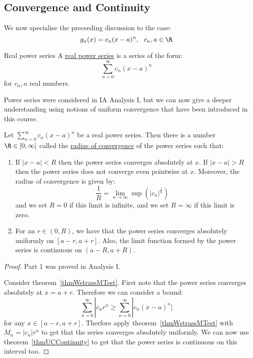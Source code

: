\documentclass[../Main.tex]{subfiles}
\begin{document}
\subsection{Convergence and Continuity}
We now specialise the preceeding discussion to the case:
\begin{equation*}
    g_n(x) = c_n (x - a)^n,~~ c_n, a \in \R
\end{equation*}
\begin{definition}{Real power series}
    A \underline{real power series} is a series of the form:
    \begin{equation*}
        \sum_{n=0}^{\infty} c_n (x-a)^n
    \end{equation*}
    for $c_n, a$ real numbers.
\end{definition}
Power series were considered in IA Analysis I, but we can now give a deeper understanding using notions of uniform convergence that have been introduced in this course.
\begin{theorem}
    Let $\sum_{n = 0}^\infty c_n (x-a)^n$ be a real power series. Then there is a number $\R \in [0, \infty]$ called the \underline{radius of convergence} of the power series such that:
    \begin{enumerate}
        \item If $|x-a| < R$ then the power series converges absolutely at $x$. If $|x-a| > R$ then the power series does not converge even pointwise at $x$.
            Moreover, the radius of convergence is given by:
            \begin{equation*}
                \frac{1}{R} = \lim_{n \to\infty} \sup(|c_n|^\frac{1}{n})
            \end{equation*}
            and we set $R = 0$ if this limit is infinite, and we set $R = \infty$ if this limit is zero.
            \item For an $r \in (0, R)$, we have that the power series converges absolutely uniformly on $[a-r,a+r]$. Also, the limit function formed by the power series is continuous on $(a-R, a+R)$.
    \end{enumerate} 
    \label{thmRadiusConvergence}
\end{theorem}
\begin{proof}
    Part 1 was proved in Analysis I.

    Consider theorem~\ref{thmWstrassMTest}. First note that the power series converges absolutely at $x = a + r$. Therefore we can consider a bound:
    \begin{equation*}
        \sum_{n = 0}^\infty |c_n r^n \geq \sum_{n = 0}^\infty |c_n (x - a)^n|
    \end{equation*}
    for any $x \in [a-r, a+r]$. Therfore apply theorem~\ref{thmWstrassMTest} with $M_n = |c_n|r^n$ to get that the series converges absolutely uniformly. We can now use theorem~\ref{thmUCContinuity} to get that the power series is continuous on this interval too.
\end{proof}
\end{document}
